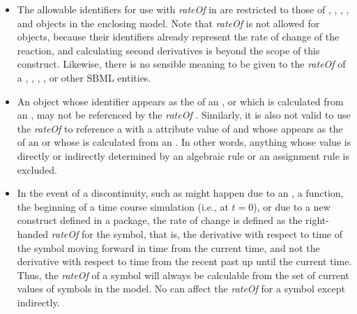 \begin{itemize}

\item The allowable identifiers for use with \emph{rateOf} in \sbmlthreecorenoversion are restricted to those of \Compartment, \LocalParameter, \Parameter, \Species, and \SpeciesReference objects in the enclosing model.  Note that \emph{rateOf} is not allowed for \Reaction objects, because their identifiers already represent the rate of change of the reaction, and calculating second derivatives is beyond the scope of this construct.  Likewise, there is no sensible meaning to be given to the \emph{rateOf} of a \FunctionDefinition, \Event, \Priority, \Delay, or other SBML entities.



\item An object whose  identifier appears as the  of an \AssignmentRule, or which is calculated from an \AlgebraicRule, may not be referenced by the \emph{rateOf} .  Similarly, it is also not valid to use the \emph{rateOf}  to reference a \Species with a  attribute value of  and whose  appears as the  of an \AssignmentRule or whose  is calculated from an \AlgebraicRule.  In other words, anything whose value is directly or indirectly determined by an algebraic rule or an assignment rule is excluded.

\item In the event of a discontinuity, such as might happen due to an \Event, a  function, the beginning of a time course simulation (i.e., at $t=0$), or due to a new construct defined in a package, the rate of change is defined as the right-handed \emph{rateOf} for the symbol, that is, the derivative with respect to time of the symbol moving forward in time from the current time, and not the derivative with respect to time from the recent past up until the current time.  Thus, the \emph{rateOf} of a symbol will always be calculable from the set of current values of symbols in the model.  No \Event can affect the \emph{rateOf} for a symbol except indirectly.


\end{itemize}

